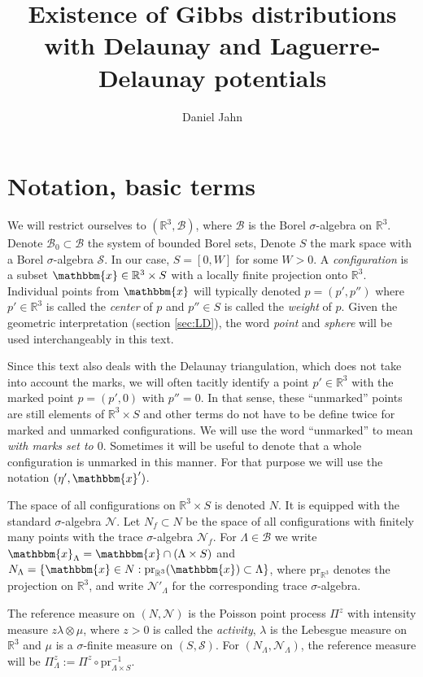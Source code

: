 \documentclass[12pt,a4paper]{article}
\title{Existence of Gibbs distributions with Delaunay and Laguerre-Delaunay potentials}
\author{Daniel Jahn}
\newcommand{\R}{{\mathbb R^3}}
\theoremstyle{definition}
\theoremstyle{remark}
\theoremstyle{theorem}
\newcommand{\x}{\mathbbm{x}}
\begin{document}
\maketitle
\tableofcontents

\section{Notation, basic terms}

We will restrict ourselves to $(\mathbb R^3, \mathcal B)$, where $\mathcal B$ is the Borel $\sigma$-algebra on $\R$. Denote $\mathcal B_0 \subset \mathcal B$ the system of bounded Borel sets, Denote $S$ the mark space with a Borel $\sigma$-algebra $\mathcal S$. In our case, $S = [0,W]$ for some $W>0$. A \textit{configuration} is a subset $\x \in \mathbb R^3\times S$ with a locally finite projection onto $\mathbb R^3$. Individual points from $\x$ will typically denoted $p=(p',p'')$ where $p' \in \mathbb R^3$ is called the \textit{center} of $p$ and $p'' \in S$ is called the \textit{weight} of $p$. Given the geometric interpretation (section \ref{sec:LD}),  the word \textit{point} and \textit{sphere} will be used interchangeably in this text.

Since this text also deals with the Delaunay triangulation, which does not take into account the marks, we will often tacitly identify a point $p'\in\R$ with the marked point $p=(p',0)$ with $p''=0$. In that sense, these ``unmarked'' points are still elements of $\R\times S$ and other terms do not have to be define twice for marked and unmarked configurations. We will use the word ``unmarked'' to mean \textit{with marks set to $0$}.  Sometimes it will be useful to denote that a whole configuration is unmarked in this manner. For that purpose we will use the notation $(\eta', \x')$. 

The space of all configurations on $\mathbb R^3 \times S$ is denoted $N$. It is equipped with the standard $\sigma$-algebra $\mathcal N$. Let $N_f \subset N$ be the space of all configurations with finitely many points with the trace $\sigma$-algebra $\mathcal N_f$. For $\Lambda\in\mathcal B$ we write $\x_{\Lambda} = \x \cap (\Lambda \times S)$ and $N_\Lambda = \{\x \in N: \text{pr}_{\R} (\x) \subset \Lambda\}$, where $\text{pr}_\R$ denotes the projection on $\R$, and write $\mathcal N'_\Lambda$ for the corresponding trace $\sigma$-algebra.

The reference measure on $(N, \mathcal N)$ is the Poisson point process $\Pi^z$ with intensity measure $z\lambda \otimes \mu$, where $z>0$ is called the \textit{activity}, $\lambda$ is the Lebesgue measure on $\mathbb R^3$ and $\mu$ is a $\sigma$-finite measure on $(S,\mathcal S)$. For $(N_\Lambda, \mathcal N_\Lambda)$, the reference measure will be $\Pi^z_\Lambda := \Pi^z \circ \text{pr}^{-1}_{\Lambda\times S}$.
\end{document}
